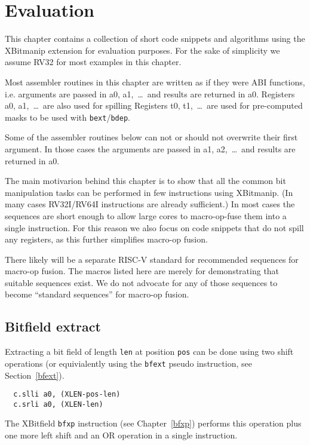 \chapter{Evaluation}

This chapter contains a collection of short code snippets and algorithms using
the XBitmanip extension for evaluation purposes. For the sake of simplicity we
assume RV32 for most examples in this chapter.

Most assembler routines in this chapter are written as if they were ABI functions,
i.e. arguments are passed in a0, a1,~\dots~and results are returned in a0. Registers
a0, a1,~\dots~are also used for spilling Registers t0, t1,~\dots~are used for
pre-computed masks to be used with {\tt bext}/{\tt bdep}.

Some of the assembler routines below can not or should not overwrite their
first argument. In those cases the arguments are passed in a1, a2,~\dots~and
results are returned in a0.

The main motivarion behind this chapter is to show that all the common bit
manipulation tasks can be performed in few instructions using XBitmanip. (In
many cases RV32I/RV64I instructions are already sufficient.) In most cases the
sequences are short enough to allow large cores to macro-op-fuse them into a
single instruction. For this reason we also focus on code snippets that do
not spill any registers, as this further simplifies macro-op fusion.

There likely will be a separate RISC-V standard for recommended sequences for
macro-op fusion. The macros listed here are merely for demonstrating that
suitable sequences exist. We do not advocate for any of those sequences to
become ``standard sequences'' for macro-op fusion.

\section{Bitfield extract}

Extracting a bit field of length {\tt len} at position {\tt pos} can be done using
two shift operations (or equivialently using the {\tt bfext} pseudo instruction, see
Section~\ref{bfext}).

\begin{verbatim}
  c.slli a0, (XLEN-pos-len)
  c.srli a0, (XLEN-len)
\end{verbatim}

The XBitfield {\tt bfxp} instruction (see Chapter~\ref{bfxp}) performs this operation
plus one more left shift and an OR operation in a single instruction.

